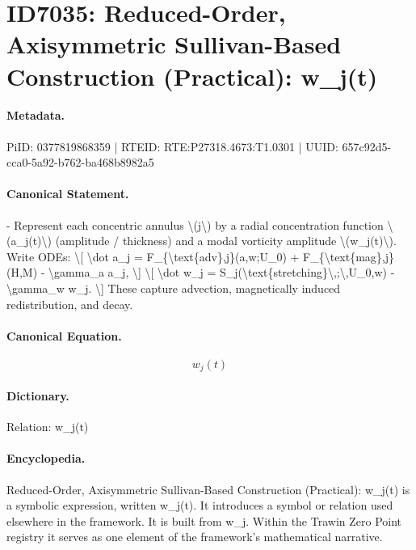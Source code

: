 \section*{ID7035: Reduced-Order, Axisymmetric Sullivan-Based Construction (Practical): w\_j(t)}
\paragraph{Metadata.}
PiID: 0377819868359 | RTEID: RTE:P27318.4673:T1.0301 | UUID: 657c92d5-cca0-5a92-b762-ba468b8982a5

\paragraph{Canonical Statement.}
- Represent each concentric annulus \textbackslash{}(j\textbackslash{}) by a radial concentration function \textbackslash{}(a\_j(t)\textbackslash{}) (amplitude / thickness) and a modal vorticity amplitude \textbackslash{}(w\_j(t)\textbackslash{}). Write ODEs: \textbackslash{}[ \textbackslash{}dot a\_j = F\_\{\textbackslash{}text\{adv\},j\}(a,w;U\_0) + F\_\{\textbackslash{}text\{mag\},j\}(H,M) - \textbackslash{}gamma\_a a\_j, \textbackslash{}] \textbackslash{}[ \textbackslash{}dot w\_j = S\_j(\textbackslash{}text\{stretching\}\textbackslash{},;\textbackslash{},U\_0,w) - \textbackslash{}gamma\_w w\_j. \textbackslash{}] These capture advection, magnetically induced redistribution, and decay.

\paragraph{Canonical Equation.}
\[
w_j(t)
\]

\paragraph{Dictionary.}
Relation: w\_j(t)

\paragraph{Encyclopedia.}
Reduced-Order, Axisymmetric Sullivan-Based Construction (Practical): w\_j(t) is a symbolic expression, written w\_j(t). It introduces a symbol or relation used elsewhere in the framework. It is built from w\_j. Within the Trawin Zero Point registry it serves as one element of the framework's mathematical narrative.
